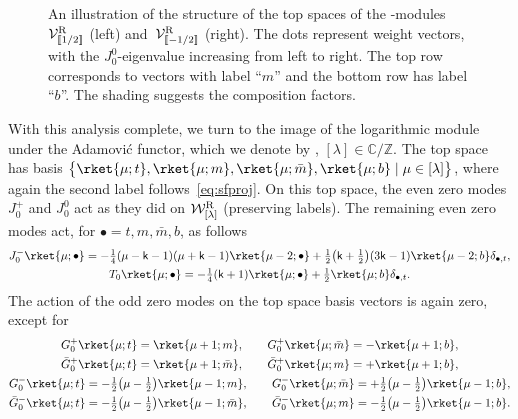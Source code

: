 \documentclass[pdftex]{sigma}
\numberwithin{equation}{section}
\newcommand{\bG}{\bar{G}{}}
\newcommand{\bm}{\bar{m}}
\newcommand{\kk}{\mathsf{k}} %
\newcommand{\NS}{\textnormal{NS}}
\newcommand{\R}{\textnormal{R}}
\DeclarePairedDelimiter{\dbrac}{\llbracket}{\rrbracket} %
\newcommand{\fld}[1]{\mathbb{#1}} %
\newcommand{\VOA}[1]{\mathsf{#1}} %
\newcommand{\Mod}[1]{\mathcal{#1}} %
\newcommand{\ZZ}{\fld{Z}}
\newcommand{\CC}{\fld{C}}
\newcommand{\swalg}[2]{\VOA{W}_{#1}^{\mathrm{#2}}} %
\newcommand{\smin}[1][\kk]{\swalg{#1}{min}} %
\newcommand{\sminpmhalf}{\smin[\pm 1/2]}
\newcommand{\sfnsmod}{\Mod{S}^{\NS}} %
\newcommand{\nrverma}[1]{\Mod{W}^{\R}_{[#1]}}
\newcommand{\nrver}[1]{\Mod{V}^{\R}_{\vphantom{[#1]}\smash{\dbrac{#1}}}}
\newcommand{\nrlog}[1]{\Mod{Q}^{\R}_{[#1]}}
\begin{document}
\begin{figure}
\caption{%
	An illustration of the structure of the top spaces of the \smash{$\sminpmhalf$}-modules $\nrver{1/2}$ (left) and~$\nrver{-1/2}$ (right).
	The dots represent weight vectors, with the $J^0_0$-eigenvalue increasing from left to right.
	The top row corresponds to vectors with label ``$m$'' and the bottom row has label ``$b$''.
	The shading suggests the composition factors.
} \label{fig:Vpm1/2}
\end{figure}

With this analysis complete, we turn to the image of the logarithmic module \smash{$\sfnsmod_{(4)}$} under the Adamovi{\'c} functor, which we denote by \smash{$\nrlog{\lambda}$}, $[\lambda] \in \CC/\ZZ$.
The top space has basis $\bigl\{ \rket{\mu;t}, \rket{\mu;m}, \rket{\mu;\bm}, \rket{\mu;b} \mid \mu \in [\lambda] \bigr\}$, where again the second label follows~\eqref{eq:sfproj}.
On this top space, the even zero modes $J^{+}_{0}$ and $J^{0}_{0}$ act as they did on $\nrverma{\lambda}$ (preserving labels).
The remaining even zero modes act, for $\bullet = t,m,\bm,b$, as follows
\begin{gather}
		J^{-}_{0} \rket{\mu;\bullet} = -\tfrac{1}{4}(\mu-\kk-1)(\mu+\kk-1) \rket{\mu-2;\bullet} + \tfrac{1}{2}\bigl(\kk+\tfrac{1}{2}\bigr)(3\kk-1) \rket{\mu-2;b} \delta_{\bullet,t}, \nonumber\\
		T_0 \rket{\mu;\bullet} = -\tfrac{1}{4}(\kk+1)\rket{\mu;\bullet} + \tfrac{1}{2} \rket{\mu;b} \delta_{\bullet,t}.\label{eq:sl2action''}
\end{gather}
The action of the odd zero modes on the top space basis vectors is again zero, except for
\begin{gather*} %
 G^{+}_{0} \rket{\mu;t} = \rket{\mu+1;m}, \qquad G^{+}_{0} \rket{\mu;\bm} = -\rket{\mu+1;b}, \\
 \bG^{+}_{0} \rket{\mu;t} = \rket{\mu+1;\bm}, \qquad \bG^{+}_{0} \rket{\mu;m} = +\rket{\mu+1;b}, \\
 G^{-}_{0} \rket{\mu;t} = -\tfrac{1}{2}\bigl(\mu-\tfrac{1}{2}\bigr) \rket{\mu-1;m},\qquad
 G^{-}_{0} \rket{\mu;\bm} = +\tfrac{1}{2}\bigl(\mu-\tfrac{1}{2}\bigr) \rket{\mu-1;b}, \\
 \bG^{-}_{0} \rket{\mu;t} = -\tfrac{1}{2}\bigl(\mu-\tfrac{1}{2}\bigr) \rket{\mu-1;\bm},\qquad
 \bG^{-}_{0} \rket{\mu;m} = -\tfrac{1}{2}\bigl(\mu-\tfrac{1}{2}\bigr) \rket{\mu-1;b}.
\end{gather*}
\end{document}
